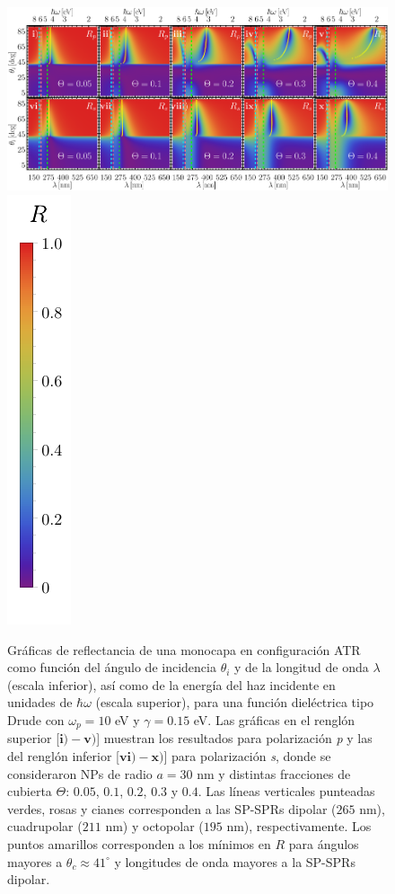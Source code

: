 	\begin{figure}[h!]\centering
\includegraphics[width = .9\linewidth]{2-Resultados/figs/2-Wp10ThetaVar/0-2D_Grid.png}%
\includegraphics[scale=.85, trim={00 -5 00 00}, clip]{2-Resultados/figs/0-RBar_v}
	\caption{Gráficas de reflectancia de una monocapa en configuración ATR como función del ángulo de incidencia $\theta_i$ y de la longitud de onda $\lambda$ (escala inferior), así como de la energía del haz incidente en unidades de $\hbar\omega$ (escala superior), para una función dieléctrica tipo Drude con $\omega_p=10$ eV  y  $\gamma=0. 15$ eV.  Las gráficas   en el renglón superior [$\mathbf{i)-v)}$] muestran los resultados  para  polarización \emph{p} y las del renglón inferior  [$\mathbf{vi)-x)}$] para polarización  \emph{s}, donde se consideraron NPs de radio $a=30$ nm y distintas fracciones de cubierta $\Theta$: $0. 05$, $0. 1$, $0. 2$, $0. 3$ y $0. 4$. Las líneas verticales punteadas verdes, rosas y cianes corresponden a las SP-SPRs dipolar ($265$ nm), cuadrupolar ($211$ nm) y octopolar ($195$ nm), respectivamente.  Los puntos amarillos corresponden a los mínimos en $R$ para ángulos mayores a $\theta_c\approx 41^\circ$ y longitudes de onda mayores a la SP-SPRs dipolar. }	\label{fig:R-ATR10}	
	\end{figure}		
		
